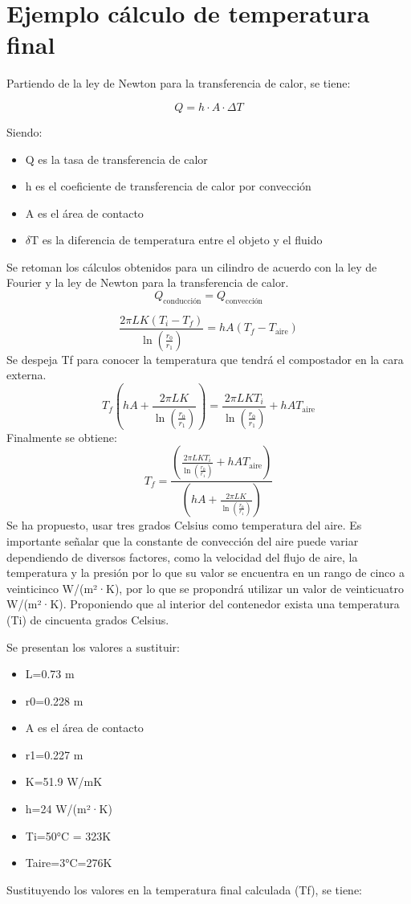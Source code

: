 \section{Ejemplo cálculo de temperatura final}\label{Ap:temp_final}

Partiendo de la ley de Newton para la transferencia de calor, se tiene:\cite{LeyNewtonCalor}

\[Q = h \cdot A \cdot \Delta T\]

Siendo:

\begin{itemize}
  \item Q es la tasa de transferencia de calor
  \item h es el coeficiente de transferencia de calor por convección
  \item A es el área de contacto
  \item $\delta$T es la diferencia de temperatura entre el objeto y el fluido
\end{itemize}
Se retoman los cálculos obtenidos para un cilindro de acuerdo con la ley de Fourier y la ley de Newton para la transferencia de calor.
\[Q_{\text{conducción}} = Q_{\text{convección}}\]

\[\frac{{2\pi L K (T_i - T_f)}}{{\ln\left(\frac{{r_0}}{{r_1}}\right)}} = h A (T_f - T_{\text{aire}})
\]
Se despeja Tf para conocer la temperatura que tendrá el compostador en la cara externa.
\[T_f \left(hA+\frac{2\pi LK}{\ln\left(\frac{r_0}{r_1}\right)}\right) = \frac{2\pi LKT_i}{\ln\left(\frac{r_0}{r_1}\right)} + hAT_{\text{aire}}
\]
Finalmente se obtiene:
\[T_f = \frac{\left(\frac{2\pi LKT_i}{\ln\left(\frac{r_0}{r_1}\right)} + hAT_{\text{aire}}\right)}{\left(hA+\frac{2\pi LK}{\ln\left(\frac{r_0}{r_1}\right)}\right)}
\]
Se ha propuesto, usar tres grados Celsius como temperatura del aire. Es importante señalar que la constante de convección del aire puede variar dependiendo de diversos factores, como la velocidad del flujo de aire, la temperatura y la presión por lo que su valor se encuentra en un rango de cinco a veinticinco W/(m²·K), por lo que se propondrá utilizar un valor de veinticuatro W/(m²·K). Proponiendo que al interior del contenedor exista una temperatura (Ti) de cincuenta grados Celsius.

Se presentan los valores a sustituir:

\begin{itemize}
  \item L=0.73 m
  \item r0=0.228 m
  \item A es el área de contacto
  \item r1=0.227 m
  \item K=51.9 W/mK
  \item h=24 W/(m²·K)
  \item Ti=50°C = 323K
  \item Taire=3°C=276K
\end{itemize}
Sustituyendo los valores en la temperatura final calculada (Tf), se tiene:

